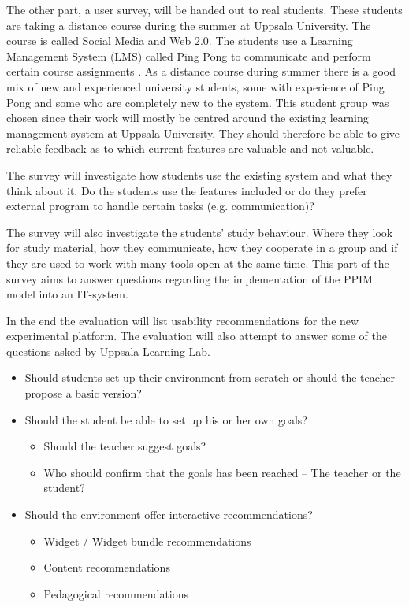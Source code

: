 The other part, a user survey, will be handed out to real students. These students are taking a distance course during the summer at Uppsala University. The course is called Social Media and Web 2.0. The students use a Learning Management System (LMS) called Ping Pong to communicate and perform certain course assignments \cite{social}. As a distance course during summer there is a good mix of new and experienced university students, some with experience of Ping Pong and some who are completely new to the system. This student group was chosen since their work will mostly be centred around the existing learning management system at Uppsala University. They should therefore be able to give reliable feedback as to which current features are valuable and not valuable.

The survey will investigate how students use the existing system and what they think about it. Do the students use the features included or do they prefer external program to handle certain tasks (e.g. communication)?

The survey will also investigate the students' study behaviour. Where they look for study material, how they communicate, how they cooperate in a group and if they are used to work with many tools open at the same time. This part of the survey aims to answer questions regarding the implementation of the PPIM model into an IT-system.

In the end the evaluation will list usability recommendations for the new experimental platform. The evaluation will also attempt to answer some of the questions asked by Uppsala Learning Lab.

\begin {itemize}
	\item Should students set up their environment from scratch or should the teacher propose a basic version?
	\item Should the student be able to set up his or her own goals?
	\begin {itemize}
		\item Should the teacher suggest goals?
		\item Who should confirm that the goals has been reached – The teacher or the student?
	\end {itemize}
	\item Should the environment offer interactive recommendations?
	\begin {itemize}
		\item Widget / Widget bundle recommendations
		\item Content recommendations
		\item Pedagogical recommendations
	\end {itemize}
\end {itemize}
